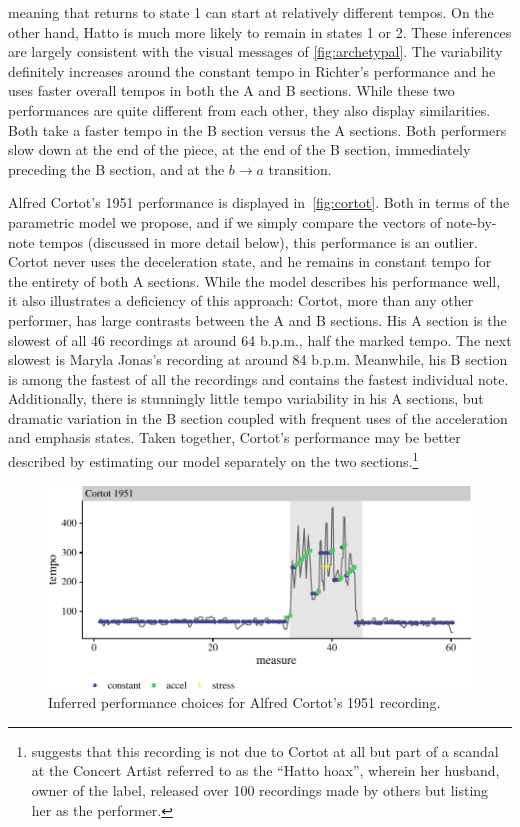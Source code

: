 \documentclass[aoas]{imsart}
\begin{document}
meaning that returns to state 1 can start at relatively different
tempos. On the other hand, Hatto is much more
likely to remain in states 1 or 2. These inferences are largely
consistent with the visual messages of \autoref{fig:archetypal}. The
variability definitely increases around the constant tempo in
Richter's performance and he uses faster overall tempos in both the A and
B sections.
%
While these two performances are quite different from each other, they
also display similarities. Both take a faster tempo in the B
section versus the A sections. Both performers slow down at the end of
the piece, at the end of the B section, immediately preceding the B section, and at the
$b\rightarrow a$ transition.

Alfred Cortot's 1951 performance is displayed
in~\autoref{fig:cortot}. Both in terms of the parametric model we
propose, and if we simply compare the vectors of note-by-note tempos
(discussed in more detail below), this performance is an
outlier. Cortot never uses the deceleration state, and he remains in
constant tempo for the entirety of both A sections. While the model
describes his performance well, it also illustrates a deficiency of
this approach: Cortot, more than any other performer, has large
contrasts between the A and B sections. His A section is the slowest
of all 46 recordings at around 64 b.p.m., half the marked
tempo. The next slowest is Maryla Jonas's recording at around 84
b.p.m. Meanwhile, his B section is among the fastest of all the
recordings and contains the fastest individual note. Additionally,
there is stunningly little tempo variability in his A sections, but
dramatic variation in the B section coupled with frequent uses of the
acceleration and emphasis states. Taken together, Cortot's performance
may be better described by estimating our model separately on the two
sections.\footnote{\citet{Cook2013} suggests that this recording is not
  due to Cortot at all but part of a scandal at the Concert Artist
  referred to as the ``Hatto hoax'', wherein her husband, owner of the
  label, released over 100 recordings made by others but listing her
  as the performer.}
\begin{figure}[t]
  \centering
    \includegraphics[width=.9\textwidth]{cortot-performance-1}
  \caption{Inferred performance choices for Alfred Cortot's 1951
    recording.}
  \label{fig:cortot}
\end{figure}
\end{document}
